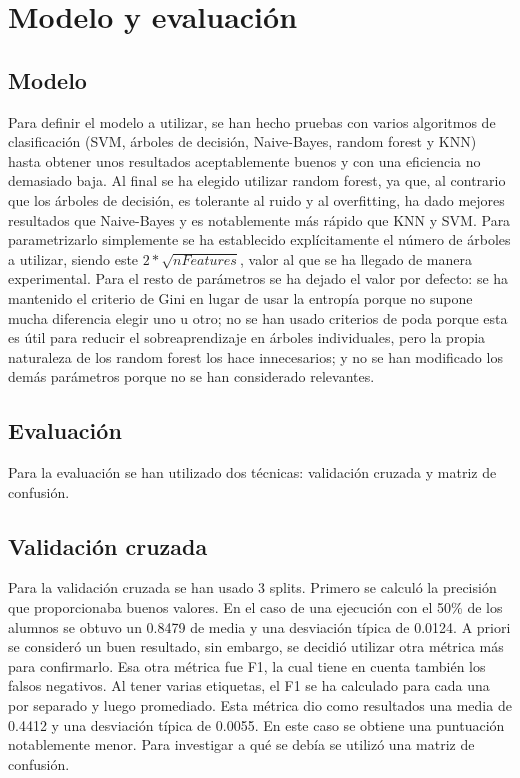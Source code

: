 \documentclass[acmtog, screen]{acmart}
\begin{document}
\section{Modelo y evaluación}
\subsection{Modelo}
Para definir el modelo a utilizar, se han hecho pruebas con varios algoritmos de clasificación (SVM, árboles de decisión, Naive-Bayes, random forest y KNN) hasta obtener unos resultados aceptablemente buenos y con una eficiencia no demasiado baja. Al final se ha elegido utilizar random forest, ya que, al contrario que los árboles de decisión, es tolerante al ruido y al overfitting, ha dado mejores resultados que Naive-Bayes y es notablemente más rápido que KNN y SVM. Para parametrizarlo simplemente se ha establecido explícitamente el número de árboles a utilizar, siendo este $2*\sqrt{nFeatures}$, valor al que se ha llegado de manera experimental. Para el resto de parámetros se ha dejado el valor por defecto: se ha mantenido el criterio de Gini en lugar de usar la entropía porque no supone mucha diferencia elegir uno u otro; no se han usado criterios de poda porque esta es útil para reducir el sobreaprendizaje en árboles individuales, pero la propia naturaleza de los random forest los hace innecesarios; y no se han modificado los demás parámetros porque no se han considerado relevantes.

\subsection{Evaluación}
Para la evaluación se han utilizado dos técnicas: validación cruzada y matriz de confusión.
\subsection{Validación cruzada}
Para la validación cruzada se han usado 3 splits. Primero se calculó la precisión que proporcionaba buenos valores. En el caso de una ejecución con el 50\% de los alumnos se obtuvo un 0.8479 de media y una desviación típica de 0.0124. A priori se consideró un buen resultado, sin embargo, se decidió utilizar otra métrica más para confirmarlo. Esa otra métrica fue F1, la cual tiene en cuenta también los falsos negativos. Al tener varias etiquetas, el F1 se ha calculado para cada una por separado y luego promediado. Esta métrica dio como resultados una media de 0.4412 y una desviación típica de 0.0055. En este caso se obtiene una puntuación notablemente menor. Para investigar a qué se debía se utilizó una matriz de confusión.
\end{document}
